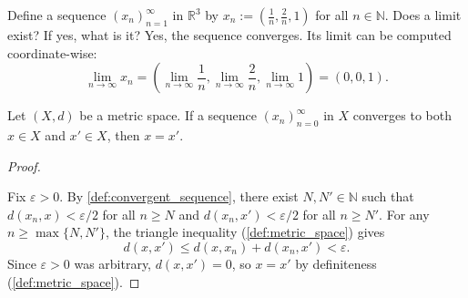 \begin{example}
\label{ex:convergent_sequence_R3}
Define a sequence $(x_n)_{n=1}^{\infty}$ in $\mathbb{R}^3$ by $x_n := \left(\frac{1}{n}, \frac{2}{n}, 1\right)$ for all $n \in \mathbb{N}$. Does a limit exist? If yes, what is it?
Yes, the sequence converges. Its limit can be computed coordinate-wise:
\[
\lim_{n\to\infty} x_n = \left(\lim_{n\to\infty} \frac{1}{n}, \lim_{n\to\infty} \frac{2}{n}, \lim_{n\to\infty} 1\right) = (0,0,1).
\]
\end{example}

\begin{proposition}
\label{prop:uniqueness_of_limits}
Let $(X,d)$ be a metric space. If a sequence $(x_n)_{n=0}^{\infty}$ in $X$ converges to both
$x \in X$ and $x' \in X$, then $x = x'$.
\end{proposition}

\begin{proof}
\begin{center}
\end{center}
Fix $\varepsilon > 0$. By \cref{def:convergent_sequence}, there exist $N, N' \in \mathbb{N}$ such
that $d(x_n,x) < \varepsilon/2$ for all $n \geq N$ and $d(x_n,x') < \varepsilon/2$ for all
$n \geq N'$. For any $n \geq \max\{N,N'\}$, the triangle inequality (\cref{def:metric_space})
gives
\[d(x,x') \leq d(x,x_n) + d(x_n,x') < \varepsilon.\]
Since $\varepsilon > 0$ was arbitrary, $d(x,x') = 0$, so $x = x'$ by definiteness
(\cref{def:metric_space}).
\end{proof}

